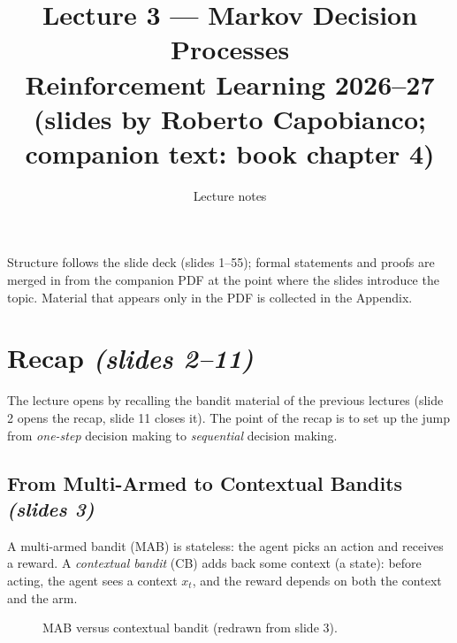 \documentclass[11pt,a4paper]{article}
\title{\textbf{Lecture 3 --- Markov Decision Processes}\\[2pt]
\large Reinforcement Learning 2026--27 \\[-1pt] \normalsize (slides by Roberto Capobianco; companion text: book chapter 4)}
\author{Lecture notes}
\date{}
\newcommand{\slr}[1]{\texorpdfstring{\emph{(slides #1)}}{(slides #1)}}
\theoremstyle{plain}
\theoremstyle{definition}
\theoremstyle{remark}
\begin{document}
\maketitle
\begin{center}\small
Structure follows the slide deck (slides 1--55); formal statements and proofs are merged in from the
companion PDF at the point where the slides introduce the topic. Material that appears only in the PDF is
collected in the Appendix.
\end{center}
\tableofcontents
\bigskip

\section{Recap \slr{2--11}}
The lecture opens by recalling the bandit material of the previous lectures (slide 2 opens the recap, slide 11 closes it). The point of the recap is to set up the jump from \emph{one-step} decision making to \emph{sequential} decision making.

\subsection{From Multi-Armed to Contextual Bandits \slr{3}}
A multi-armed bandit (MAB) is stateless: the agent picks an action and receives a reward. A \emph{contextual bandit} (CB) adds back some context (a state): before acting, the agent sees a context $x_t$, and the reward depends on both the context and the arm.

\begin{figure}[htbp]
\centering
{}
\caption{MAB versus contextual bandit (redrawn from slide 3).}
\end{figure}
\end{document}
